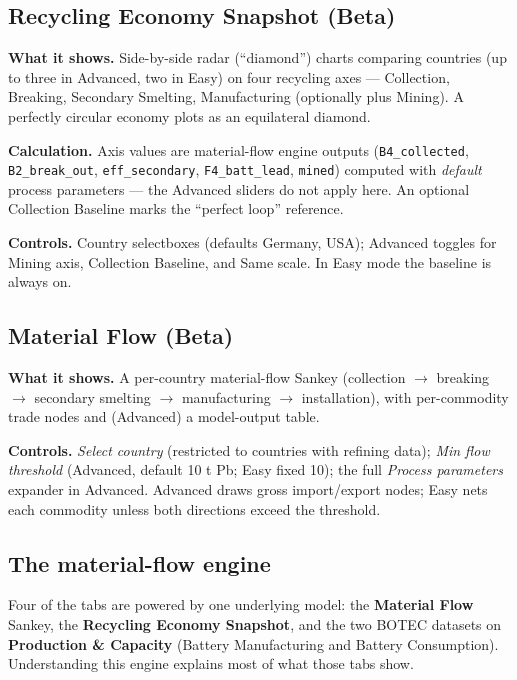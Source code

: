 \documentclass[11pt,a4paper]{article}
\newcommand{\code}[1]{\texttt{\small #1}}
\begin{document}
\subsection{Recycling Economy Snapshot (Beta)}

\textbf{What it shows.} Side-by-side radar (``diamond'') charts comparing
countries (up to three in Advanced, two in Easy) on four recycling axes ---
Collection, Breaking, Secondary Smelting, Manufacturing (optionally plus Mining).
A perfectly circular economy plots as an equilateral diamond.

\textbf{Calculation.} Axis values are material-flow engine outputs
(\code{B4\_collected}, \code{B2\_break\_out}, \code{eff\_secondary},
\code{F4\_batt\_lead}, \code{mined}) computed with \emph{default} process
parameters --- the Advanced sliders do not apply here. An optional Collection
Baseline marks the ``perfect loop'' reference.

\textbf{Controls.} Country selectboxes (defaults Germany, USA); Advanced toggles
for Mining axis, Collection Baseline, and Same scale. In Easy mode the baseline is
always on.

\subsection{Material Flow (Beta)}

\textbf{What it shows.} A per-country material-flow Sankey (collection $\to$
breaking $\to$ secondary smelting $\to$ manufacturing $\to$ installation), with
per-commodity trade nodes and (Advanced) a model-output table.

\textbf{Controls.} \emph{Select country} (restricted to countries with refining
data); \emph{Min flow threshold} (Advanced, default 10 t Pb; Easy fixed 10); the
full \emph{Process parameters} expander in Advanced. Advanced draws gross
import/export nodes; Easy nets each commodity unless both directions exceed the
threshold.

\subsection{The material-flow engine}\label{sec:engine}

Four of the tabs are powered by one underlying model: the \textbf{Material Flow}
Sankey, the \textbf{Recycling Economy Snapshot}, and the two BOTEC datasets on
\textbf{Production \& Capacity} (Battery Manufacturing and Battery Consumption).
Understanding this engine explains most of what those tabs show.
\end{document}
